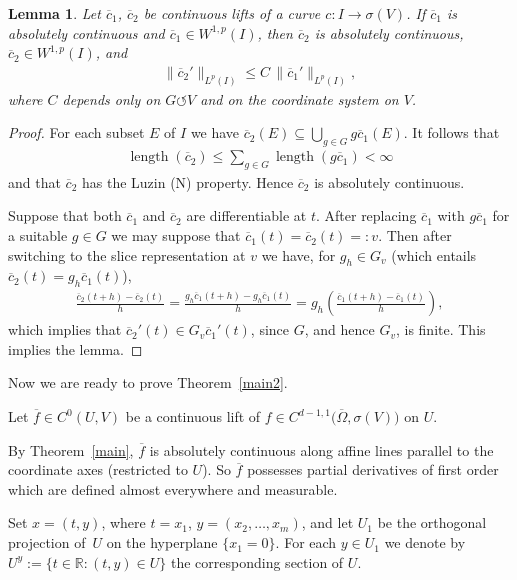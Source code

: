 \documentclass[pdftex]{sigma}
\numberwithin{equation}{section}
\newtheorem{Lemma}[Theorem]{Lemma}
\def\si{\sigma}
\def\Om{\Omega}
\def\R{\mathbb{R}}
\def\ol{\overline}
\def\acts{\circlearrowleft}
\let\on=\operatorname
\begin{document}
\begin{Lemma} \label{lem:2}
	Let $\ol c_1$, $\ol c_2$ be continuous lifts of a curve $c \colon I \to \si(V)$.
	If $\ol c_1$ is absolutely continuous and $\ol c_1 \in W^{1,p}(I)$, then $\ol c_2$ is absolutely continuous, $\ol c_2 \in W^{1,p}(I)$, and
	\begin{gather*}
		\|\ol c_2' \|_{L^p(I)} \le C\, \|\ol c_1' \|_{L^p(I)},
	\end{gather*}
	where $C$ depends only on $G \acts V$ and on the coordinate system on $V$.
\end{Lemma}

\begin{proof}
	For each subset $E$ of $I$ we have $\ol c_2 (E) \subseteq \bigcup_{g \in G} g \ol c_1(E)$.
	It follows that
	\begin{gather*}
		\on{length}(\ol c_2) \le \sum_{g \in G} \on{length}(g \ol c_1) < \infty
	\end{gather*}
	and that $\ol c_2$ has the Luzin (N) property. Hence $\ol c_2$ is absolutely continuous.

	Suppose that both $\ol c_1$ and $\ol c_2$ are differentiable at $t$.
	After replacing $\ol c_1$ with $g \ol c_1$ for a suitable $g\in G$ we may suppose that $\ol c_1(t) = \ol c_2(t) =:v$.
	Then after switching to the slice representation at $v$ we have, for $g_h \in G_v$ (which entails $\ol c_2(t) = g_h \ol c_1(t)$),
	\begin{gather*}
		\frac{\ol c_2 (t+h) - \ol c_2(t)}{h} = \frac{g_h \ol c_1 (t+h) - g_h \ol c_1(t)}{h} = g_h \left(\frac{ \ol c_1 (t+h) - \ol c_1(t)}{h}\right),
	\end{gather*}
	which implies that $\ol c_2'(t) \in G_v \ol c_1'(t)$, since $G$, and hence $G_v$, is finite.
	This implies the lemma.
\end{proof}

Now we are ready to prove Theorem~\ref{main2}.

Let $\ol f \in C^0(U,V)$ be a continuous lift of $f \in C^{d-1,1}\big(\ol \Om,\si(V)\big)$ on $U$.


 By Theorem~\ref{main}, $\ol f$ is absolutely continuous along affine lines parallel to
 the coordinate axes (restricted to $U$).
 So $\ol f$ possesses partial derivatives of first order which are defined almost everywhere and measurable.

 Set $x=(t,y)$, where $t=x_1$, $y=(x_2,\dots,x_m)$,
 and let $U_1$ be the orthogonal projection of~$U$ on the hyperplane $\{x_1=0\}$.
 For each $y \in U_1$ we denote by $U^y := \{t \in \R \colon (t,y) \in U\}$ the corresponding section of $U$.
\end{document}
